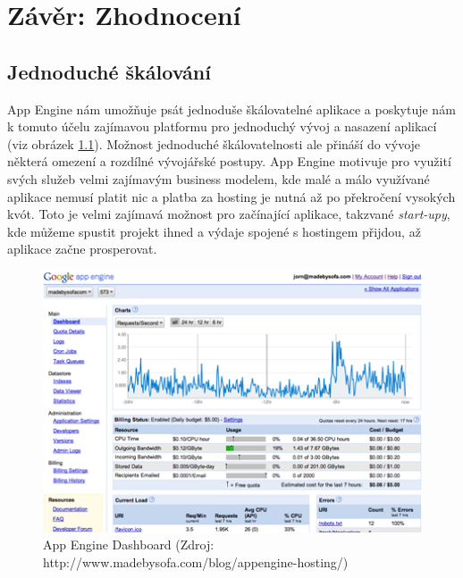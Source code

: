 \chapter{Závěr: Zhodnocení}

\section{Jednoduché škálování}
App Engine nám umožňuje psát jednoduše škálovatelné aplikace a poskytuje nám k tomuto účelu zajímavou platformu pro jednoduchý vývoj a nasazení aplikací (viz obrázek \ref{fig:app-engine-dashboard}). Možnost jednoduché škálovatelnosti ale přináší do vývoje některá omezení a rozdílné vývojářské postupy. App Engine motivuje pro využití svých služeb velmi zajímavým business modelem, kde malé a málo využívané aplikace nemusí platit nic a platba za hosting je nutná až po překročení vysokých kvót. Toto je velmi zajímavá možnost pro začínající aplikace, takzvané \emph{start-upy}, kde můžeme spustit projekt ihned a výdaje spojené s hostingem přijdou, až aplikace začne prosperovat.

\begin{figure}[h]
\begin{center}
\includegraphics[width=5.7in]{figures/app-engine-dashboard.png}
\caption[App Engine Dashboard]{App Engine Dashboard 
(Zdroj: http://www.madebysofa.com/blog/appengine-hosting/)}
\label{fig:app-engine-dashboard}
\end{center}
\end{figure}

